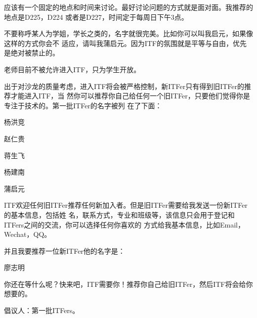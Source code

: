 \documentclass[12pt,a4paper]{article}
\begin{document}
\begin{center}
  应该有一个固定的地点和时间来讨论。最好讨论问题的方式就是面对面。我推荐的地点是D225，D224
  或者是D227，时间定于每周日下午3点。
  
  不要称呼某人为学姐，学长之类的，名字就很完美。比如你可以叫我启元，如果像这样的方式你会不
  适应，请叫我蒲启元。因为ITF的氛围就是平等与自由，优先是绝对被禁止的。
  
  老师目前不被允许进入ITF，只为学生开放。
  
  出于对沙龙的质量考虑，进入ITF将会被严格控制，新ITFer只有得到旧ITFer的推荐才能进入ITF，当
  然你可以推荐你自己给任何一个旧ITFer，只要他们觉得你是专注于技术的。第一批ITFer的名字被列
  在了下面：
  
  杨洪竞
  
  赵仁贵
  
  蒋生飞
  
  杨建南
  
  蒲启元
  
  ITF欢迎任何旧ITFer推荐任何新加入者。但是旧ITFer需要给我发送一份新ITFer的基本信息，包括姓
  名，联系方式，专业和班级等，该信息只会用于登记和ITFers之间的交流，你可以选择任何你喜欢的
  方式给我基本信息，比如Email，Wechat，QQ。
  
  并且我要推荐一位新ITFer他的名字是：
  
  廖志明
  
\end{center}

你还在等什么呢？快来吧，ITF需要你！推荐你自己给旧ITFer，然后ITF将会给你想要的。

倡议人：第一批ITFers。



\clearpage
\end{document}
